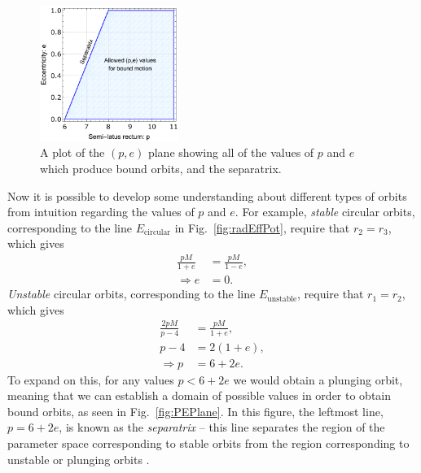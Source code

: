 \begin{figure}
    \centering
    \includegraphics[width=0.4\textwidth]{images/PEPlane.pdf}
    \caption[Plot of $(p,e)$-plane with separatrix]{A plot of the $(p,e)$ plane showing all of the values of $p$ and $e$ which produce bound orbits, and the separatrix.}
    \label{fig:PEPlane}
\end{figure}
\noindent
Now it is possible to develop some understanding about different types of orbits from intuition regarding the values of $p$ and $e$.
For example, \textit{stable} circular orbits, corresponding to the line $E_\text{circular}$ in Fig.~\eqref{fig:radEffPot}, require that $r_2=r_3$, which gives
\begin{align}
    \frac{pM}{1+e}&=\frac{pM}{1-e},\\
    \Rightarrow e&=0.
\end{align}
\noindent
\textit{Unstable} circular orbits, corresponding to the line $E_\text{unstable}$, require that $r_1=r_2$, which gives
\begin{align}
    \frac{2pM}{p-4}&=\frac{pM}{1+e},\\
    p-4&=2(1+e),\\
    \Rightarrow p&=6+2e.
\end{align}
To expand on this, for any values $p<6+2e$ we would obtain a plunging orbit, meaning that we can establish a domain of possible values in order to obtain bound orbits, as seen in Fig.~\eqref{fig:PEPlane}.
In this figure, the leftmost line, $p=6+2e$, is known as the \textit{separatrix} -- this line separates the region of the parameter space corresponding to stable orbits from the region corresponding to unstable or plunging orbits \cite{nielsLastStableOrbit}.\\


